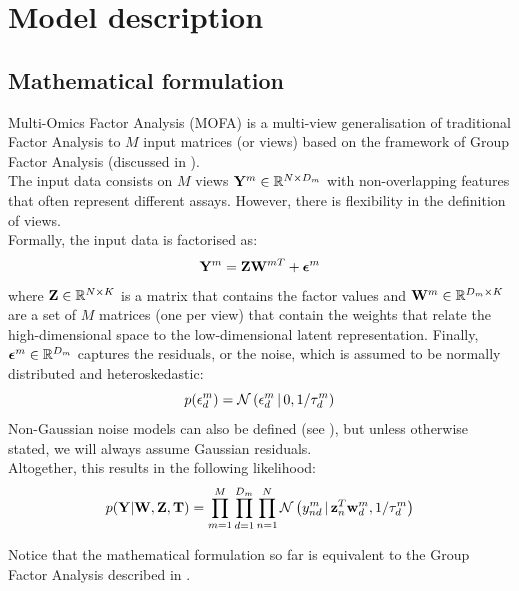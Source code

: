 \graphicspath{{Chapter2/Figs/}}

\section{Model description} \label{mofa:model_description}

\subsection{Mathematical formulation}

Multi-Omics Factor Analysis (MOFA) is a multi-view generalisation of traditional Factor Analysis to $M$ input matrices (or views) based on the framework of Group Factor Analysis (discussed in ).\\
The input data consists on $M$ views ${\bf Y}^m \in \mathbb{R}^{N \times D_m}$ with non-overlapping features that often represent different assays. However, there is flexibility in the definition of views.\\
Formally, the input data is factorised as:
\begin{equation} \label{mofa_master_equation}
	\mathbf{Y}^m = \mathbf{Z}\mathbf{W}^{mT} + \mbox{\boldmath $\epsilon$}^m
\end{equation}
where ${\bf Z} \in \mathbb{R}^{N \times K}$ is a matrix that contains the factor values and ${\bf W}^m \in \mathbb{R}^{D_m \times K}$ are a set of $M$ matrices (one per view) that contain the weights that relate the high-dimensional space to the low-dimensional latent representation. Finally, $\mbox{\boldmath $\epsilon$}^m \in \mathbb{R}^{D_m}$ captures the residuals, or the noise, which is assumed to be normally distributed and heteroskedastic:
\begin{equation}
	p(\epsilon^{m}_{d}) = \mathcal{N}\left(\epsilon^{m}_{d} \,|\, 0,1/\tau_{d}^{m}\right)
\end{equation}
Non-Gaussian noise models can also be defined (see ), but unless otherwise stated, we will always assume Gaussian residuals.\\
Altogether, this results in the following likelihood:
\begin{equation}
	p({\bf Y}|{\bf W},{\bf Z},\mbox{\boldmath $\mathrm{T}$}) = \prod_{m=1}^{M} \prod_{d=1}^{D_m} \prod_{n=1}^{N} \mathcal{N}\left(y_{nd}^m \,|\, {\bf z}_{n}^T{\bf w}_{d}^{m},1/\tau_d^m\right)
\end{equation}

Notice that the mathematical formulation so far is equivalent to the Group Factor Analysis described in .

